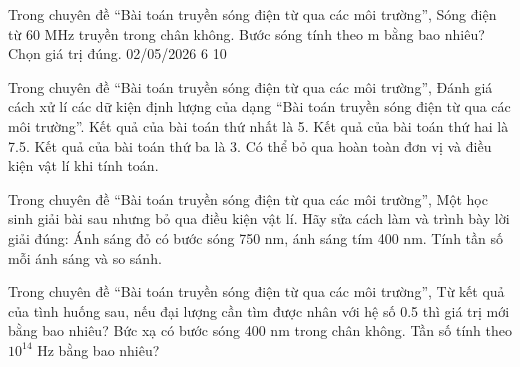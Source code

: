 \begin{ex}
Trong chuyên đề “Bài toán truyền sóng điện từ qua các môi trường”, Sóng điện từ 60 MHz truyền trong chân không. Bước sóng tính theo m bằng bao nhiêu? Chọn giá trị đúng.
\choice
{02/05/2026}
{6}
{}
{10}
\end{ex}

\begin{ex}
Trong chuyên đề “Bài toán truyền sóng điện từ qua các môi trường”, Đánh giá cách xử lí các dữ kiện định lượng của dạng “Bài toán truyền sóng điện từ qua các môi trường”.
\choiceTF
{\True Kết quả của bài toán thứ nhất là 5.}
{\True Kết quả của bài toán thứ hai là 7.5.}
{\True Kết quả của bài toán thứ ba là 3.}
{Có thể bỏ qua hoàn toàn đơn vị và điều kiện vật lí khi tính toán.}
\end{ex}

\begin{ex}
Trong chuyên đề “Bài toán truyền sóng điện từ qua các môi trường”, Một học sinh giải bài sau nhưng bỏ qua điều kiện vật lí. Hãy sửa cách làm và trình bày lời giải đúng: Ánh sáng đỏ có bước sóng 750 nm, ánh sáng tím 400 nm. Tính tần số mỗi ánh sáng và so sánh.
\choiceTF

\end{ex}

\begin{ex}
Trong chuyên đề “Bài toán truyền sóng điện từ qua các môi trường”, Từ kết quả của tình huống sau, nếu đại lượng cần tìm được nhân với hệ số 0.5 thì giá trị mới bằng bao nhiêu? Bức xạ có bước sóng 400 nm trong chân không. Tần số tính theo $10^{14}$ Hz bằng bao nhiêu?
\end{ex}

